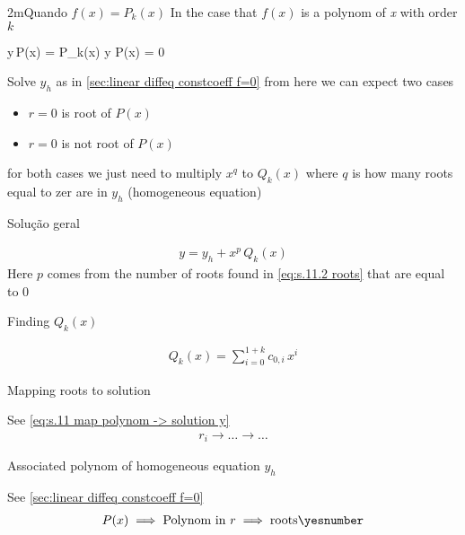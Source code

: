 \documentclass["AM3C-Slides_annotations.tex"]{subfiles}
\begin{document}
\begin{sectionBox}2m{Quando \(f(x)=P_k(x)\)} %
  \label{sec:linear diffeq constcoef f=Pk}
  In the case that \(f(x)\) is a polynom of \textit{x} with order \(k\)
  \begin{BM}
    y\,P(x) = P_k(x)
    \implies
    y\,\,P(x) = 0
  \end{BM}
  Solve \(y_h\) as in \ref{sec:linear diffeq constcoeff f=0} from here we can expect two cases
  \begin{itemize}
    \item \(r=0\) is \phantom{not} root of \(P(x)\)
    \item \(r=0\) is not root of \(P(x)\)
  \end{itemize}
  for both cases we just need to multiply \(x^q\) to \(Q_k(x)\) where \(q\) is how many roots equal to zer are in \(y_h\) (homogeneous equation)

  Solução geral
  \begin{tcolorbox}
    \begin{gather*}
      y 
      = y_h 
      + x^p\,Q_k(x)
    \end{gather*}
    Here \(p\) comes from the number of roots found in \eqref{eq:s.11.2 roots} that are equal to 0
  \end{tcolorbox}

  Finding \(Q_k(x)\)
  \begin{tcolorbox}
    \begin{gather*}
      Q_k(x)
      = \sum_{i=0}^{1+k}{
        c_{0,i}\,x^i
      }
    \end{gather*}
  \end{tcolorbox}

  Mapping roots to solution
  \begin{tcolorbox}
    See \ref{eq:s.11 map polynom -> solution y}
    \begin{gather*}
      r_i \to \dots \to \dots
    \end{gather*}
  \end{tcolorbox}

  Associated polynom of homogeneous equation \(y_h\)
  \begin{tcolorbox}
    See \ref{sec:linear diffeq constcoeff f=0}
    \begin{gather*}
      P(x)
      \implies \text{Polynom in } r
      \implies \text{roots}
      \yesnumber\label{eq:s.11.2 roots}
    \end{gather*}
  \end{tcolorbox}
\end{sectionBox}
\end{document}
